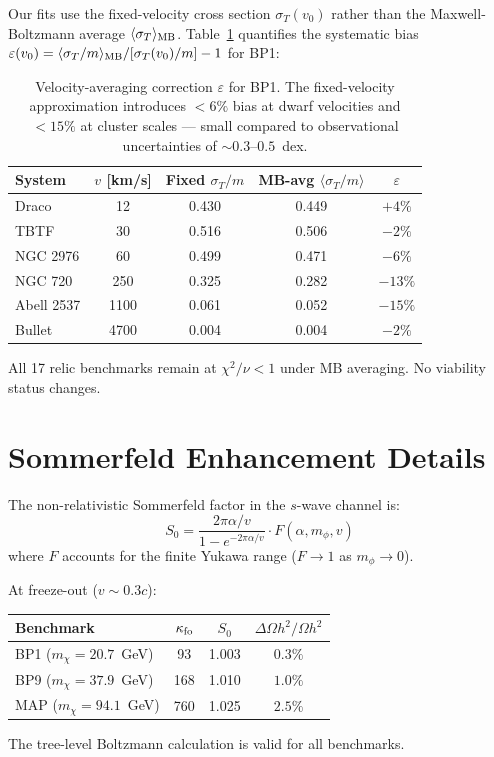 \documentclass[12pt,a4paper]{article}
\newcommand{\sigmaT}{\sigma_T}
\begin{document}
Our fits use the fixed-velocity cross section $\sigmaT(v_0)$ rather than
the Maxwell-Boltzmann average $\langle\sigmaT\rangle_{\rm MB}$.
Table~\ref{tab:mb} quantifies the systematic bias
$\varepsilon(v_0) = \langle\sigmaT/m\rangle_{\rm MB}/[\sigmaT(v_0)/m] - 1$
for BP1:

\begin{table}[h!]
\centering
\caption{Velocity-averaging correction $\varepsilon$ for BP1.
         The fixed-velocity approximation introduces $< 6\%$ bias at dwarf
         velocities and $< 15\%$ at cluster scales — small compared to
         observational uncertainties of $\sim 0.3$--$0.5$~dex.}
\label{tab:mb}
\begin{tabular}{lcccc}
\toprule
System & $v$ [km/s] & Fixed $\sigmaT/m$ & MB-avg $\langle\sigmaT/m\rangle$ & $\varepsilon$ \\
\midrule
Draco      & 12   & 0.430 & 0.449 & $+4\%$ \\
TBTF       & 30   & 0.516 & 0.506 & $-2\%$ \\
NGC 2976   & 60   & 0.499 & 0.471 & $-6\%$ \\
NGC 720    & 250  & 0.325 & 0.282 & $-13\%$ \\
Abell 2537 & 1100 & 0.061 & 0.052 & $-15\%$ \\
Bullet     & 4700 & 0.004 & 0.004 & $-2\%$ \\
\bottomrule
\end{tabular}
\end{table}

All 17 relic benchmarks remain at $\chi^2/\nu < 1$ under MB averaging.
No viability status changes.

\section{Sommerfeld Enhancement Details}
\label{app:sommerfeld}

The non-relativistic Sommerfeld factor in the $s$-wave channel is:
\begin{equation}
  S_0 = \frac{2\pi\alpha/v}{1 - e^{-2\pi\alpha/v}} \cdot F(\alpha, m_\phi, v)
\end{equation}
where $F$ accounts for the finite Yukawa range ($F \to 1$ as $m_\phi \to 0$).

At freeze-out ($v \sim 0.3c$):
\begin{center}
\begin{tabular}{lccc}
\toprule
Benchmark & $\kappa_{\rm fo}$ & $S_0$ & $\Delta\Omega h^2/\Omega h^2$ \\
\midrule
BP1 ($m_\chi = 20.7$~GeV) & 93  & 1.003 & $0.3\%$ \\
BP9 ($m_\chi = 37.9$~GeV) & 168 & 1.010 & $1.0\%$ \\
MAP ($m_\chi = 94.1$~GeV) & 760 & 1.025 & $2.5\%$ \\
\bottomrule
\end{tabular}
\end{center}
The tree-level Boltzmann calculation is valid for all benchmarks.
\end{document}
